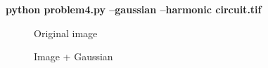 \pagebreak
\begin{minipage}{\textwidth}
\textbf{python problem4.py --gaussian --harmonic circuit.tif} \\
\end{minipage}

\begin{figure}[!htb]\centering
    \begin{minipage}{0.45\textwidth}
        \caption{\small{Original image}}
    \end{minipage}
    \begin{minipage}{0.45\textwidth}
        \caption{\small{Image + Gaussian}}
    \end{minipage}
\end{figure}

